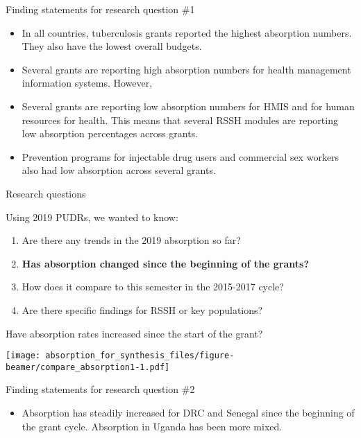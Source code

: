 \documentclass[ignorenonframetext,]{beamer}
\providecommand{\tightlist}{%
  \setlength{\itemsep}{0pt}\setlength{\parskip}{0pt}}
\begin{document}
\begin{frame}{Finding statements for research question \#1}
\protect\hypertarget{finding-statements-for-research-question-1}{}

\begin{itemize}
\tightlist
\item
  In all countries, tuberculosis grants reported the highest absorption
  numbers. They also have the lowest overall budgets.
\item
  Several grants are reporting high absorption numbers for health
  management information systems. However,
\item
  Several grants are reporting low absorption numbers for HMIS and for
  human resources for health. This means that several RSSH modules are
  reporting low absorption percentages across grants.
\item
  Prevention programs for injectable drug users and commercial sex
  workers also had low absorption across several grants.
\end{itemize}

\end{frame}

\begin{frame}{Research questions}
\protect\hypertarget{research-questions-2}{}

Using 2019 PUDRs, we wanted to know:

\begin{enumerate}
\tightlist
\item
  Are there any trends in the 2019 absorption so far?
\item
  \textbf{Has absorption changed since the beginning of the grants?}
\item
  How does it compare to this semester in the 2015-2017 cycle?
\item
  Are there specific findings for RSSH or key populations?
\end{enumerate}

\end{frame}

\begin{frame}{Have absorption rates increased since the start of the
grant?}
\protect\hypertarget{have-absorption-rates-increased-since-the-start-of-the-grant}{}

\texttt{[image: absorption\_for\_synthesis\_files/figure-beamer/compare\_absorption1-1.pdf]}

\end{frame}

\begin{frame}{Finding statements for research question \#2}
\protect\hypertarget{finding-statements-for-research-question-2}{}

\begin{itemize}
\tightlist
\item
  Absorption has steadily increased for DRC and Senegal since the
  beginning of the grant cycle. Absorption in Uganda has been more
  mixed.
\end{itemize}

\end{frame}
\end{document}
